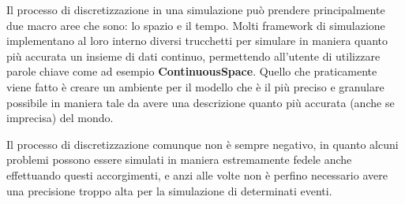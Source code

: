 Il processo di discretizzazione in una simulazione può prendere 
principalmente due macro aree che sono: lo spazio e il tempo. 
Molti framework di simulazione implementano al loro interno 
diversi trucchetti per simulare in maniera quanto più accurata
un insieme di dati continuo, permettendo all'utente di utilizzare
parole chiave come ad esempio \textbf{ContinuousSpace}. Quello che praticamente
viene fatto è creare un ambiente per il modello che è il più
preciso e granulare possibile in maniera tale da avere una descrizione
quanto più accurata (anche se imprecisa) del mondo. 

Il processo di discretizzazione comunque non è sempre negativo, 
in quanto alcuni problemi possono essere simulati in maniera 
estremamente fedele anche effettuando questi accorgimenti, e anzi
alle volte non è perfino necessario avere una precisione troppo 
alta per la simulazione di determinati eventi.